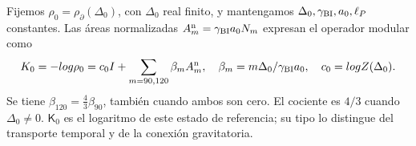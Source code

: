 Fijemos \(\rho_0=\rho_\partial(\Delta_0)\), con
\(\Delta_0\) real finito, y mantengamos
\(\Delta_0,\gamma_{\rm BI},a_0,\ell_P\) constantes. Las áreas
normalizadas \(\mathcal A_m^{\rm n}=\gamma_{\rm BI}a_0\mathsf N_m\)
expresan el operador modular como
\begin{equation}
 \mathsf K_0=-\log\rho_0
 =c_0I+\sum_{m=90,120}\beta_m\mathcal A_m^{\rm n},
 \quad \beta_m=\frac{m\Delta_0}{\gamma_{\rm BI}a_0},
 \quad c_0=\log Z(\Delta_0).
 \label{x_reciprocidad:vii:eq:operador-modular-areal}
\end{equation}
Se tiene \(\beta_{120}=\tfrac43\beta_{90}\), también cuando ambos
son cero. El cociente es \(4/3\) cuando \(\Delta_0\ne0\).
\(\mathsf K_0\) es el logaritmo de este estado de referencia; su tipo
lo distingue del transporte temporal y de la conexión gravitatoria.

